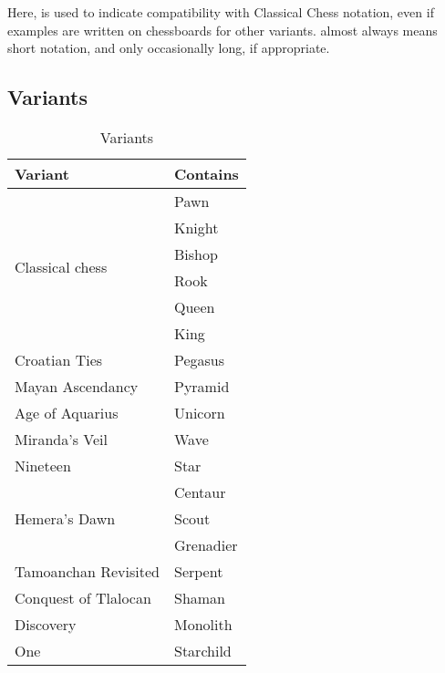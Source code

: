 Here,  is used to indicate compatibility with Classical Chess notation, even if
examples are written on chessboards for other variants.  almost always means
short notation, and only occasionally long, if appropriate.

\clearpage %

\subsection*{Variants}
\label{sec:Appendix/Introduction/Variants}

\begin{table}[!h]
\centering
\begin{tabular}{ ll }
\toprule %
\textbf{Variant} & \textbf{Contains}           \\
\midrule %
\multirow{6}{*}{Classical chess} & Pawn        \\
                                 & Knight      \\
                                 & Bishop      \\
                                 & Rook        \\
                                 & Queen       \\
                                 & King        \\
\cmidrule{1-2} %
Croatian Ties                    & Pegasus     \\
Mayan Ascendancy                 & Pyramid     \\
Age of Aquarius                  & Unicorn     \\
Miranda's Veil                   & Wave        \\
Nineteen                         & Star        \\
\cmidrule{1-2} %
\multirow{3}{*}{Hemera's Dawn}   & Centaur     \\
                                 & Scout       \\
                                 & Grenadier   \\
\cmidrule{1-2} %
Tamoanchan Revisited             & Serpent     \\
Conquest of Tlalocan             & Shaman      \\
Discovery                        & Monolith    \\
One                              & Starchild   \\
\bottomrule %
\end{tabular}
\caption{Variants}
\label{tbl:Appendix/Introduction/Variants}
\end{table}

